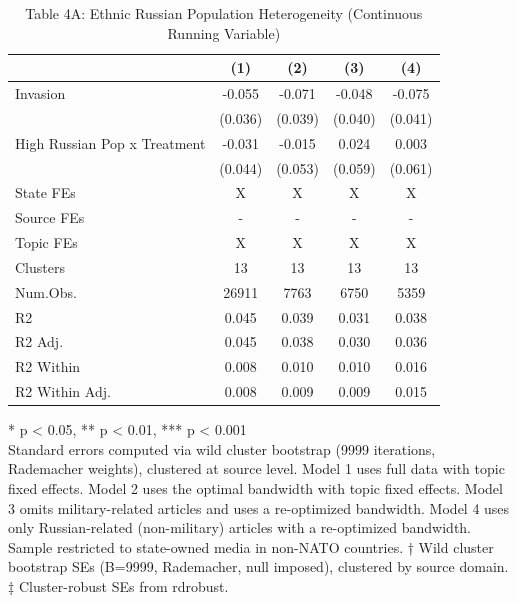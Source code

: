 \begin{table}[t]
\caption{\label{tab:table4a}Table 4A: Ethnic Russian Population Heterogeneity (Continuous Running Variable)} 
\fontsize{12.0pt}{14.0pt}\selectfont
\begin{tabular*}{\linewidth}{@{\extracolsep{\fill}}lcccc}
\toprule
  & (1) & (2) & (3) & (4) \\ 
\midrule\addlinespace[2.5pt]
Invasion & -0.055 & -0.071 & -0.048 & -0.075 \\ 
 & (0.036) & (0.039) & (0.040) & (0.041) \\ 
High Russian Pop x Treatment & -0.031 & -0.015 & 0.024 & 0.003 \\ 
{} & {(0.044)} & {(0.053)} & {(0.059)} & {(0.061)} \\ 
State FEs & X & X & X & X \\ 
Source FEs & - & - & - & - \\ 
Topic FEs & X & X & X & X \\ 
Clusters & 13 & 13 & 13 & 13 \\ 
Num.Obs. & 26911 & 7763 & 6750 & 5359 \\ 
R2 & 0.045 & 0.039 & 0.031 & 0.038 \\ 
R2 Adj. & 0.045 & 0.038 & 0.030 & 0.036 \\ 
R2 Within & 0.008 & 0.010 & 0.010 & 0.016 \\ 
R2 Within Adj. & 0.008 & 0.009 & 0.009 & 0.015 \\ 
\bottomrule
\end{tabular*}
\begin{minipage}{\linewidth}
\vspace{.05em}
* p < 0.05, ** p < 0.01, *** p < 0.001\\
Standard errors computed via wild cluster bootstrap (9999 iterations, Rademacher
weights), clustered at source level. Model 1 uses full data with topic fixed
effects. Model 2 uses the optimal bandwidth with topic fixed effects. Model 3
omits military-related articles and uses a re-optimized bandwidth. Model 4 uses
only Russian-related (non-military) articles with a re-optimized bandwidth.
Sample restricted to state-owned media in non-NATO countries. † Wild cluster
bootstrap SEs (B=9999, Rademacher, null imposed), clustered by source domain. ‡
Cluster-robust SEs from rdrobust.\\
\end{minipage}
\end{table}

